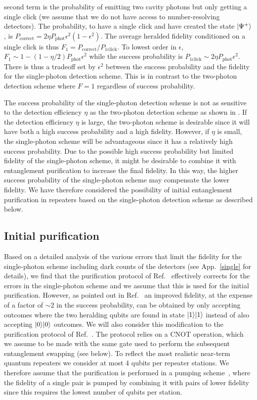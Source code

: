 second term is the probability of emitting two cavity photons but only getting a
single click (we assume that we do not have access to number-resolving
detectors). The probability, to have a single click and have created the state
$| \Psi^{+} \rangle$, is $P_{\mathrm{correct}}=2\eta
P_{\mathrm{phot}}\epsilon^{2}(1-\epsilon^{2})$. The average heralded fidelity
conditioned on a single click is thus
$F_{1}=P_{\mathrm{correct}}/P_{\mathrm{1click}}$. To lowest order in $\epsilon$,
$F_{1}\sim1-(1-\eta/2)P_{\mathrm{phot}}\epsilon^{2}$ while the success probability
is $P_{\mathrm{1click}}\sim2\eta P_{\mathrm{phot}}\epsilon^{2}$. There is thus a
tradeoff set by $\epsilon^{2}$ between the success probability and the fidelity
for the single-photon detection scheme. This is in contrast to the two-photon
detection scheme where $F=1$ regardless of success probability.

The success probability of the single-photon detection scheme is not as
sensitive to the detection efficiency $\eta$ as the two-photon detection scheme
as shown in .
If the detection efficiency $\eta$ is large, the two-photon scheme is desirable
since it will have both a high success probability and a high fidelity. However,
if $\eta$ is small, the single-photon scheme will be advantageous since it has a
relatively high success probability. Due to the possible high success
probability but limited fidelity of the single-photon scheme, it might be
desirable to combine it with entanglement purification to increase the final
fidelity. In this way, the higher success probability of the single-photon
scheme may compensate the lower fidelity. We have therefore considered the possibility
of initial entanglement purification in repeaters based on the single-photon
detection scheme as described below.

\subsection{Initial purification}
Based on a detailed analysis of the various errors that limit the fidelity for
the single-photon scheme including dark counts of the detectors (see
App.~\ref{single} for details), we find that the purification protocol of
Ref.~\cite{bennett} effectively corrects for the errors in the single-photon
scheme and we assume that this is used for the initial purification. However, as
pointed out in Ref.~\cite{nickerson} an improved fidelity, at the expense of a
factor of $\sim2$ in the success probability, can be obtained by only accepting
outcomes where the two heralding qubits are found in state $| 1 \rangle| 1 \rangle$
instead of also accepting $| 0 \rangle| 0 \rangle$ outcomes. We will also consider this
modification to the purification protocol of Ref.~\cite{bennett}. The protocol
relies on a CNOT operation, which we assume to be made with the same gate used
to perform the subsequent entanglement swapping (see below). To reflect the most
realistic near-term quantum repeaters we consider at most 4 qubits per repeater
stations. We therefore assume that the purification is performed in a pumping
scheme~\cite{briegel2}, where the fidelity of a single pair is pumped by
combining it with pairs of lower fidelity since this requires the lowest number
of qubits per station.


